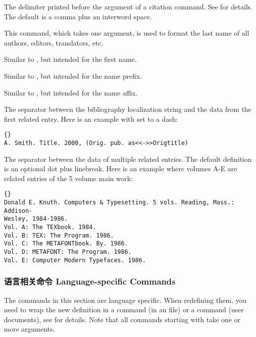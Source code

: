 \begin{ltxsyntax}
The delimiter printed before the  argument of a citation command. See  for details. The default is a comma plus an interword space.

This command, which takes one argument, is used to format the last name of all authors, editors, translators, etc.

Similar to , but intended for the first name.

Similar to , but intended for the name prefix.

Similar to , but intended for the name affix.

The separator between the  bibliography localization string and the data from the first related entry. Here is an example with  set to a dash:

\begin{lstlisting}[style=latex]{}
A. Smith. Title. 2000, (Orig. pub. as<<->>Origtitle)
\end{lstlisting}

The separator between the data of multiple related entries. The default definition is an optional dot plus linebreak. Here is an example where volumes A-E are related entries of the 5 volume main work:

\begin{lstlisting}[style=latex]{}
Donald E. Knuth. Computers & Typesetting. 5 vols. Reading, Mass.: Addison-
Wesley, 1984-1986.
Vol. A: The TEXbook. 1984.
Vol. B: TEX: The Program. 1986.
Vol. C: The METAFONTbook. By. 1986.
Vol. D: METAFONT: The Program. 1986.
Vol. E: Computer Modern Typefaces. 1986.
\end{lstlisting}

\end{ltxsyntax}

\subsubsection{语言相关命令 Language-specific Commands}
\label{use:fmt:lng}

The commands in this section are language specific. When redefining them, you need to wrap the new definition in a  command (in an  file) or a  command (user documents), see  for details. Note that all commands starting with  take one or more arguments.


